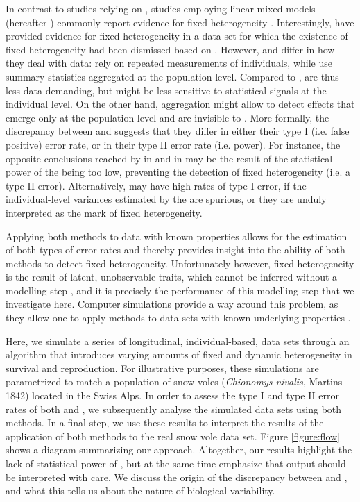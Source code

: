 In contrast to studies relying on \NSM, studies employing linear mixed models (hereafter \MM) commonly report evidence for fixed heterogeneity \parencite[e.g.][] {Cam2000,Royle2008,Chambert2013,Guillemain2013,Chambert2014}. Interestingly, \cite{Cam2013} have provided evidence for fixed heterogeneity in a data set for which the existence of fixed heterogeneity had been dismissed based on \NSM \parencite{Steiner2010}. However, \MM and \NSM differ in how they deal with data: \MM rely on repeated measurements of individuals, while \NSM use summary statistics aggregated at the population level. Compared to \MM, \NSM are thus less data-demanding, but might be less sensitive to statistical signals at the individual level. On the other hand, aggregation might allow \NSM to detect effects that emerge only at the population level and are invisible to \MM.
More formally, the discrepancy between \NSM and \MM suggests that they differ in either their type I (i.e. false positive) error rate, or in their type II error rate (i.e. power). For instance, the opposite conclusions reached by \NSM in \cite{Steiner2010} and \MM in \cite{Cam2013} may be the result of the statistical power of the \NSM being too low, preventing the detection of fixed heterogeneity (i.e. a type II error). Alternatively, \MM may have high rates of type I error, if the individual-level variances estimated by the \MM are spurious, or they are unduly interpreted as the mark of fixed heterogeneity.

Applying both methods to data with known properties allows for the estimation of both types of error rates and thereby provides insight into the ability of both methods to detect fixed heterogeneity. Unfortunately however, fixed heterogeneity is the result of latent, unobservable traits, which cannot be inferred without a modelling step \parencite{Cam2013}, and it is precisely the performance of this modelling step that we investigate here. Computer simulations provide a way around this problem, as they allow one to apply methods to data sets with known underlying properties \parencite[e.g.][]{DeVillemereuil2013,Brooks2013}.

Here, we simulate a series of longitudinal, individual-based, data sets through an algorithm that introduces varying amounts of fixed and dynamic heterogeneity in survival and reproduction. For illustrative purposes, these simulations are parametrized to match a population of snow voles (\textit{Chionomys nivalis}, Martins 1842) located in the Swiss Alps. In order to assess the type I and type II error rates of both \NSM and \MM, we subsequently analyse the simulated data sets using both methods. In a final step, we use these results to interpret the results of the application of both methods to the real snow vole data set. Figure \ref{figure:flow} shows a diagram summarizing our approach. Altogether, our results highlight the lack of statistical power of \NSM, but at the same time emphasize that \MM output should be interpreted with care. We discuss the origin of the discrepancy between \NSM and \MM, and what this tells us about the nature of biological variability.

